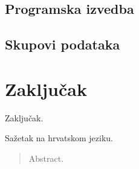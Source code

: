 \documentclass[utf8, diplomski, lmodern]{fer}
\begin{document}
\section{Programska izvedba}


\section{Skupovi podataka}



\chapter{Zaključak}

Zaključak.




\begin{sazetak}
Sažetak na hrvatskom jeziku.

\end{sazetak}

\begin{abstract}
Abstract.

\end{abstract}
\end{document}
